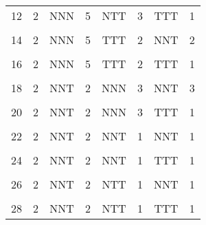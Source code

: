 \begin{table}[H]
{\begin{tabular}[t]{cccccccc}
			12 & 2 & NNN & 5 & NTT & 3 & TTT & 1\\
			\cellcolor{gray!6}{13} & \cellcolor{gray!6}{2} & \cellcolor{gray!6}{NNN} & \cellcolor{gray!6}{5} & \cellcolor{gray!6}{TTT} & \cellcolor{gray!6}{2} & \cellcolor{gray!6}{NNN} & \cellcolor{gray!6}{3}\\
			14 & 2 & NNN & 5 & TTT & 2 & NNT & 2\\
			\cellcolor{gray!6}{15} & \cellcolor{gray!6}{2} & \cellcolor{gray!6}{NNN} & \cellcolor{gray!6}{5} & \cellcolor{gray!6}{TTT} & \cellcolor{gray!6}{2} & \cellcolor{gray!6}{NTT} & \cellcolor{gray!6}{1}\\
			16 & 2 & NNN & 5 & TTT & 2 & TTT & 1\\
			\cellcolor{gray!6}{17} & \cellcolor{gray!6}{2} & \cellcolor{gray!6}{NNT} & \cellcolor{gray!6}{2} & \cellcolor{gray!6}{NNN} & \cellcolor{gray!6}{3} & \cellcolor{gray!6}{NNN} & \cellcolor{gray!6}{4}\\
			18 & 2 & NNT & 2 & NNN & 3 & NNT & 3\\
			\cellcolor{gray!6}{19} & \cellcolor{gray!6}{2} & \cellcolor{gray!6}{NNT} & \cellcolor{gray!6}{2} & \cellcolor{gray!6}{NNN} & \cellcolor{gray!6}{3} & \cellcolor{gray!6}{NTT} & \cellcolor{gray!6}{2}\\
			20 & 2 & NNT & 2 & NNN & 3 & TTT & 1\\
			\cellcolor{gray!6}{21} & \cellcolor{gray!6}{2} & \cellcolor{gray!6}{NNT} & \cellcolor{gray!6}{2} & \cellcolor{gray!6}{NNT} & \cellcolor{gray!6}{1} & \cellcolor{gray!6}{NNN} & \cellcolor{gray!6}{2}\\
			22 & 2 & NNT & 2 & NNT & 1 & NNT & 1\\
			\cellcolor{gray!6}{23} & \cellcolor{gray!6}{2} & \cellcolor{gray!6}{NNT} & \cellcolor{gray!6}{2} & \cellcolor{gray!6}{NNT} & \cellcolor{gray!6}{1} & \cellcolor{gray!6}{NTT} & \cellcolor{gray!6}{1}\\
			24 & 2 & NNT & 2 & NNT & 1 & TTT & 1\\
			\cellcolor{gray!6}{25} & \cellcolor{gray!6}{2} & \cellcolor{gray!6}{NNT} & \cellcolor{gray!6}{2} & \cellcolor{gray!6}{NTT} & \cellcolor{gray!6}{1} & \cellcolor{gray!6}{NNN} & \cellcolor{gray!6}{1}\\
			26 & 2 & NNT & 2 & NTT & 1 & NNT & 1\\
			\cellcolor{gray!6}{27} & \cellcolor{gray!6}{2} & \cellcolor{gray!6}{NNT} & \cellcolor{gray!6}{2} & \cellcolor{gray!6}{NTT} & \cellcolor{gray!6}{1} & \cellcolor{gray!6}{NTT} & \cellcolor{gray!6}{1}\\
			28 & 2 & NNT & 2 & NTT & 1 & TTT & 1\\

\end{tabular}}
\end{table}
